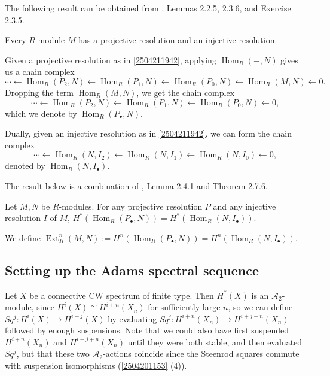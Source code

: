 \documentclass{MetricNotes2023}
\def\A{\ensuremath{\mathscr{A}_2}}
\DeclareMathOperator{\Ext}{Ext}
\DeclareMathOperator{\Hom}{Hom}
\def\textcolour{\textcolor}
\begin{document}
The following result can be obtained from \autocite{weibel}, Lemmas 2.2.5, 2.3.6, and Exercise 2.3.5. 

\begin{lemma}
Every \(R\)-module \(M\) has a projective resolution and an injective resolution. 
\end{lemma}

Given a projective resolution as in \ref{2504211942}, applying \(\Hom_R(-, N)\) gives us a chain complex
\[\cdots \leftarrow \Hom_R(P_2, N) \leftarrow \Hom_R(P_1, N) \leftarrow \Hom_R(P_0, N) \leftarrow \Hom_R(M, N) \leftarrow 0.\]
Dropping the term \(\Hom_R(M, N)\), we get the chain complex
\[\cdots \leftarrow \Hom_R(P_2, N) \leftarrow \Hom_R(P_1, N) \leftarrow \Hom_R(P_0, N) \leftarrow 0,\]
which we denote by \(\Hom_R(P_\bullet, N)\). 

Dually, given an injective resolution as in \ref{2504211942}, we can form the chain complex
\[\cdots \leftarrow \Hom_R(N, I_2) \leftarrow \Hom_R(N, I_1) \leftarrow \Hom_R(N, I_0)\leftarrow 0,\]
denoted by \(\Hom_R(N, I_\bullet)\).

The result below is a combination of \autocite{weibel}, Lemma 2.4.1 and Theorem 2.7.6. 

\begin{proposition}
Let \(M, N\) be \(R\)-modules. For any projective resolution \(P\) and any injective resolution \(I\) of \(M\), \(H^*(\Hom_R(P_\bullet, N))=H^*(\Hom_R(N,I_\bullet))\).
\end{proposition}

We define \(\Ext^{n}_R(M,N):=H^n(\Hom_R(P_\bullet, N))=H^n(\Hom_R(N, I_\bullet))\). 

\subsection{Setting up the Adams spectral sequence}\label{2504291248}

Let \(X\) be a connective CW spectrum of finite type. Then \(H^*(X)\) is an \(\A\)-module, since \(H^i(X)\cong H^{i+n}(X_n)\) for sufficiently large \(n\), so we can define \(Sq^j : H^i(X)\to H^{i+j}(X)\) by evaluating \(Sq^j : H^{i+n}(X_n)\to H^{i+j+n}(X_n)\) followed by enough suspensions. Note that we could also have first suspended \(H^{i+n}(X_n)\) and \(H^{i+j+n}(X_n)\) until they were both stable, and then evaluated \(Sq^j\), but that these two \(\A\)-actions coincide since the Steenrod squares commute with suspension isomorphisms (\ref{2504201153} (4)). %
\end{document}
